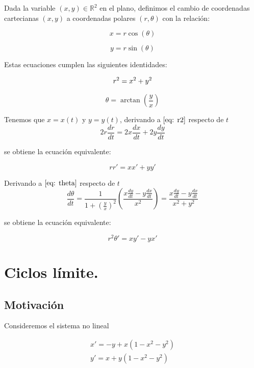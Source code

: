 \documentclass[12pt, a4paper]{report}
\begin{document}
Dada la variable $(x,y)\in\mathbb{R}^2$ en el plano, 
definimos el cambio de coordenadas cartecianas $(x,y)$ 
a coordenadas polares $(r,\theta)$  con la relación:

\begin{equation}\label{eq: xpolar}
	x=r\cos(\theta)
\end{equation}

\begin{equation}\label{eq: ypolar}
	y=r\sin(\theta)
\end{equation}

Estas ecuaciones cumplen las siguientes identidades:

\begin{equation}\label{eq: r2}
	r^2=x^2+y^2\\
\end{equation}

\begin{equation}\label{eq: theta}
	\theta=\arctan{(\frac{y}{x})}
\end{equation}

Tenemos que $x=x(t)$ y $y=y(t)$, derivando a $\eqref{eq: r2}$ respecto de $t$
	      $$	2r\frac{dr}{dt}=2x\frac{dx}{dt}+2y\frac{dy}{dt} $$

se obtiene la ecuación equivalente:

\begin{equation}\label{eq: drcart}
		      rr'=xx'+yy'
\end{equation}

Derivando a $\eqref{eq: theta}$ respecto de $t$
	      $$\frac{d\theta}{dt}=\frac{1}{1+(\frac{y}{x})^2}(\frac{x\frac{dy}{dt}-y\frac{dx}{dt}}{x^2})=\frac{x\frac{dy}{dt}-y\frac{dx}{dt}}{x^2+y^2}$$

se obtiene la ecuación equivalente:
	      
\begin{equation}\label{eq: dthetacart}
		      r^2\theta'=xy'-yx'
\end{equation}


\chapter{Ciclos límite.}
\section{Motivación}

Consideremos el sistema no lineal

\begin{equation}\label{eq: sis1}
	\begin{matrix}
		x'=-y+x(1-x^2-y^2) \\
		y'=x+y(1-x^2-y^2)
	\end{matrix}
\end{equation}
\end{document}
